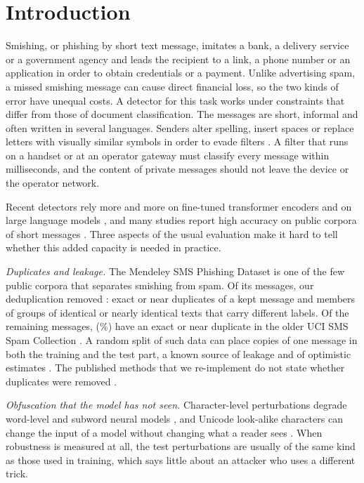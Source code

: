 \section{Introduction}\label{sec:intro}

Smishing, or phishing by short text message, imitates a bank, a delivery service or a government agency and leads the recipient to a link, a phone number or an application in order to obtain credentials or a payment. Unlike advertising spam, a missed smishing message can cause direct financial loss, so the two kinds of error have unequal costs. A detector for this task works under constraints that differ from those of document classification. The messages are short, informal and often written in several languages. Senders alter spelling, insert spaces or replace letters with visually similar symbols in order to evade filters \cite{salman2024,boucher2022}. A filter that runs on a handset or at an operator gateway must classify every message within milliseconds, and the content of private messages should not leave the device or the operator network.

Recent detectors rely more and more on fine-tuned transformer encoders \cite{ghourabi2023,shim2024} and on large language models \cite{salman2025spallm,topcuoglu2026}, and many studies report high accuracy on public corpora of short messages \cite{mishra2023dsmishsms,mishra2022detector,sonowal2020,roy2020,mahmud2024}. Three aspects of the usual evaluation make it hard to tell whether this added capacity is needed in practice.

\emph{Duplicates and leakage.} The Mendeley SMS Phishing Dataset \cite{mendeley2022,mishra2023dataset} is one of the few public corpora that separates smishing from spam. Of its  messages, our deduplication removed : exact or near duplicates of a kept message and members of  groups of identical or nearly identical texts that carry different labels. Of the  remaining messages,  (\%) have an exact or near duplicate in the older UCI SMS Spam Collection \cite{almeida2011}. A random split of such data can place copies of one message in both the training and the test part, a known source of leakage and of optimistic estimates \cite{kapoor2023,lee2022}. The published methods that we re-implement do not state whether duplicates were removed \cite{mahmud2024,shim2024}.

\emph{Obfuscation that the model has not seen.} Character-level perturbations degrade word-level and subword neural models \cite{gao2018,li2019,pruthi2019}, and Unicode look-alike characters can change the input of a model without changing what a reader sees \cite{boucher2022}. When robustness is measured at all, the test perturbations are usually of the same kind as those used in training, which says little about an attacker who uses a different trick.

